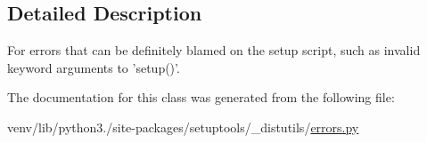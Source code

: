 \subsection{Detailed Description}
\begin{DoxyVerb}For errors that can be definitely blamed on the setup script,
such as invalid keyword arguments to 'setup()'.\end{DoxyVerb}
 

The documentation for this class was generated from the following file\+:\begin{DoxyCompactItemize}
\item 
venv/lib/python3./site-\/packages/setuptools/\+\_\+distutils/\hyperlink{__distutils_2errors_8py}{errors.\+py}\end{DoxyCompactItemize}

